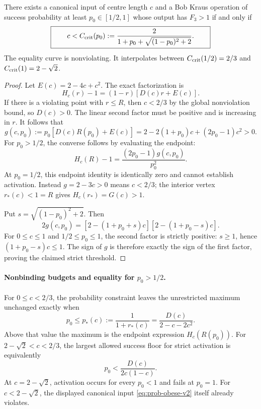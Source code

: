 \begin{corollary}\label{cor:success-threshold-v2}
There exists a canonical input of centre length $c$ and a Bob Kraus operation
of success probability at least $p_0\in[1/2,1]$ whose output has $F_3>1$
if and only if
\begin{equation}\label{eq:success-critical-v2}
 \boxed{\qquad c<C_{\rm crit}(p_0):=
 \frac{2}{1+p_0+\sqrt{(1-p_0)^2+2}}.\qquad}
\end{equation}
The equality curve is nonviolating. It interpolates between
$C_{\rm crit}(1/2)=2/3$ and $C_{\rm crit}(1)=2-\sqrt2$.
\end{corollary}

\begin{proof}
Let $E(c)=2-4c+c^2$. The exact factorization is
\begin{equation}\label{eq:prob-factor-v2}
 H_c(r)-1=(1-r)[D(c)r+E(c)].
\end{equation}
If there is a violating point with $r\leq R$, then $c<2/3$ by the global
nonviolation bound, so $D(c)>0$. The linear second factor must be positive
and is increasing in $r$. It follows that
\[
 g(c,p_0):=p_0[D(c)R(p_0)+E(c)]
          =2-2(1+p_0)c+(2p_0-1)c^2>0.
\]
For $p_0>1/2$, the converse follows by evaluating the endpoint:
\[
 H_c(R)-1=\frac{(2p_0-1)g(c,p_0)}{p_0^2}.
\]
At $p_0=1/2$, this endpoint identity is identically zero and cannot establish
activation. Instead $g=2-3c>0$ means $c<2/3$; the interior vertex
$r_*(c)<1=R$ gives $H_c(r_*)=G(c)>1$.

Put $s=\sqrt{(1-p_0)^2+2}$. Then
\[
 2g(c,p_0)=[2-(1+p_0+s)c][2-(1+p_0-s)c].
\]
For $0\leq c\leq1$ and $1/2\leq p_0\leq1$, the second factor is strictly
positive: $s\geq1$, hence $(1+p_0-s)c\leq1$. The sign of $g$ is therefore
exactly the sign of the first factor, proving the claimed strict threshold.
\end{proof}

\paragraph{Nonbinding budgets and equality for $p_0>1/2$.}
For $0\leq c<2/3$, the probability constraint leaves the unrestricted maximum
unchanged exactly when
\begin{equation}\label{eq:nonbinding-prob-v2}
 p_0\leq p_*(c):=\frac1{1+r_*(c)}
                  =\frac{D(c)}{2-c-2c^2}.
\end{equation}
Above that value the maximum is the endpoint expression $H_c(R(p_0))$.
For $2-\sqrt2<c<2/3$, the largest allowed success floor for strict activation
is equivalently
\[
 p_0<\frac{D(c)}{2c(1-c)}.
\]
At $c=2-\sqrt2$, activation occurs for every $p_0<1$ and fails at $p_0=1$.
For $c<2-\sqrt2$, the displayed canonical input
\eqref{eq:prob-obese-v2} itself already violates.

